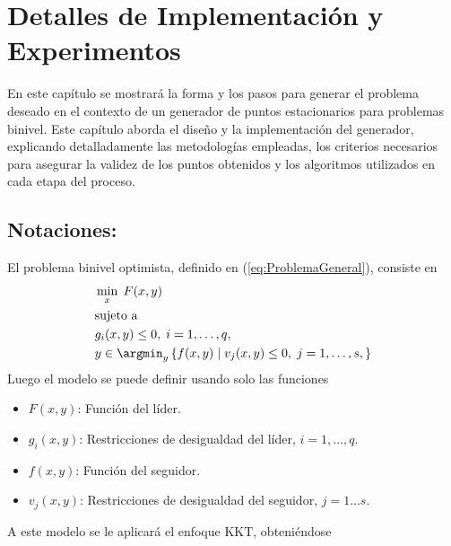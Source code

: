 \chapter{Detalles de Implementación y Experimentos}\label{chapter:implementation}

En este capítulo se mostrará la forma y los pasos para generar el problema deseado en el contexto de un generador de puntos estacionarios para problemas binivel. Este capítulo aborda el diseño y la implementación del generador, explicando detalladamente las metodologías empleadas, los criterios necesarios para asegurar la validez de los puntos obtenidos y los algoritmos utilizados en cada etapa del proceso.

\section{Notaciones:}
 El problema binivel optimista, definido en (\ref{eq:ProblemaGeneral}), consiste en
\begin{equation}
\begin{aligned}
& \min_{x} \; F(x, y) \\
& \text{sujeto a } \\
& g_i(x, y)\leq 0,\;i=1,\ldots,q, \\
& y \in \argmin_{y} \left\{ f(x, y) \mid v_j(x, y)\leq 0,\;j=1,\ldots,s ,\right\}
\end{aligned}
\end{equation}
Luego el modelo se puede definir usando solo las funciones 
\begin{itemize}
    \item$F(x,y)$: Función del líder.                                                                                                          \\
       \item $ g_i(x,y) $:               Restricciones de desigualdad del líder,  $ i=1,\ldots, q$.       \\
        \item $ f(x,y) $:            Función del seguidor.                                                               \\
       \item $ v_j(x,y) $:                Restricciones de desigualdad del seguidor, $j=1\ldots s$.   \\
    \end{itemize}
A este modelo se le aplicará el enfoque KKT, obteniéndose
